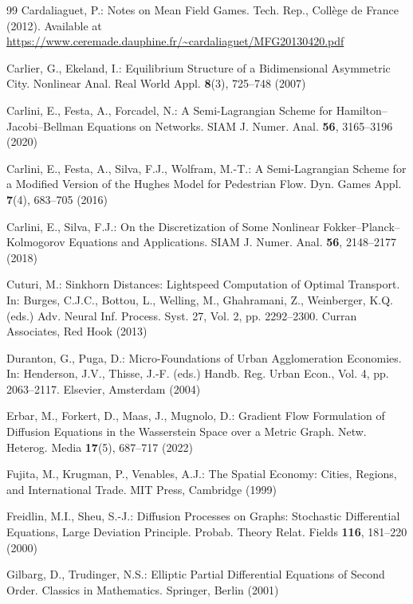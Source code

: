 \documentclass[smallextended,referee,envcountsect,]{svjour3}
\begin{document}
\begin{thebibliography}{99}
Cardaliaguet, P.:
Notes on Mean Field Games.
Tech. Rep., Coll\`ege de France (2012).
Available at \url{https://www.ceremade.dauphine.fr/~cardaliaguet/MFG20130420.pdf}

Carlier, G., Ekeland, I.:
Equilibrium Structure of a Bidimensional Asymmetric City.
Nonlinear Anal. Real World Appl. \textbf{8}(3), 725--748 (2007)

Carlini, E., Festa, A., Forcadel, N.:
A Semi-Lagrangian Scheme for Hamilton--Jacobi--Bellman Equations on Networks.
SIAM J. Numer. Anal. \textbf{56}, 3165--3196 (2020)

Carlini, E., Festa, A., Silva, F.J., Wolfram, M.-T.:
A Semi-Lagrangian Scheme for a Modified Version of the Hughes Model for Pedestrian Flow.
Dyn. Games Appl. \textbf{7}(4), 683--705 (2016)

Carlini, E., Silva, F.J.:
On the Discretization of Some Nonlinear Fokker--Planck--Kolmogorov Equations and Applications.
SIAM J. Numer. Anal. \textbf{56}, 2148--2177 (2018)

Cuturi, M.:
Sinkhorn Distances: Lightspeed Computation of Optimal Transport.
In: Burges, C.J.C., Bottou, L., Welling, M., Ghahramani, Z., Weinberger, K.Q. (eds.)
Adv. Neural Inf. Process. Syst. 27, Vol. 2, pp. 2292--2300.
Curran Associates, Red Hook (2013)

Duranton, G., Puga, D.:
Micro-Foundations of Urban Agglomeration Economies.
In: Henderson, J.V., Thisse, J.-F. (eds.)
Handb. Reg. Urban Econ., Vol. 4, pp. 2063--2117.
Elsevier, Amsterdam (2004)

Erbar, M., Forkert, D., Maas, J., Mugnolo, D.:
Gradient Flow Formulation of Diffusion Equations in the Wasserstein Space over a Metric Graph.
Netw. Heterog. Media \textbf{17}(5), 687--717 (2022)

Fujita, M., Krugman, P., Venables, A.J.:
The Spatial Economy: Cities, Regions, and International Trade.
MIT Press, Cambridge (1999)

Freidlin, M.I., Sheu, S.-J.:
Diffusion Processes on Graphs: Stochastic Differential Equations, Large Deviation Principle.
Probab. Theory Relat. Fields \textbf{116}, 181--220 (2000)

Gilbarg, D., Trudinger, N.S.:
Elliptic Partial Differential Equations of Second Order.
Classics in Mathematics.
Springer, Berlin (2001)


\end{thebibliography}
\end{document}
